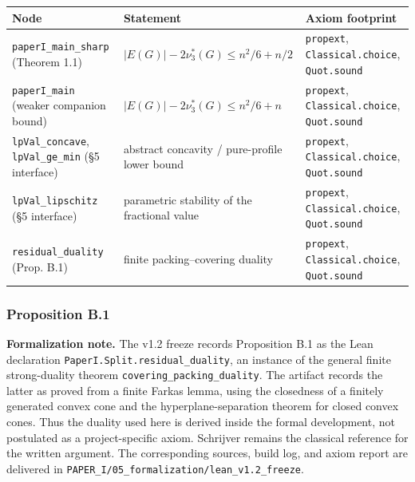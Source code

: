 \documentclass[english,11pt,a4paper]{article}
\newcounter{none}
\begin{document}
{\def\LTcaptype{none} %
\begin{longtable}[]{@{}
  >{\raggedright\arraybackslash}p{}
  >{\raggedright\arraybackslash}p{}
  >{\raggedright\arraybackslash}p{}@{}}
\toprule\noalign{}
\begin{minipage}[b]{\linewidth}\raggedright
Node
\end{minipage} & \begin{minipage}[b]{\linewidth}\raggedright
Statement
\end{minipage} & \begin{minipage}[b]{\linewidth}\raggedright
Axiom footprint
\end{minipage} \\
\midrule\noalign{}
\endhead
\bottomrule\noalign{}
\endlastfoot
\nolinkurl{paperI_main_sharp} (Theorem 1.1) &
\(\lvert E(G)\rvert-2\nu_3^*(G)\le n^2/6+n/2\) & \nolinkurl{propext},
\nolinkurl{Classical.choice}, \nolinkurl{Quot.sound} \\
\nolinkurl{paperI_main} (weaker companion bound) &
\(\lvert E(G)\rvert-2\nu_3^*(G)\le n^2/6+n\) & \nolinkurl{propext},
\nolinkurl{Classical.choice}, \nolinkurl{Quot.sound} \\
\nolinkurl{lpVal_concave}, \nolinkurl{lpVal_ge_min} (§5 interface) &
abstract concavity / pure-profile lower bound & \nolinkurl{propext},
\nolinkurl{Classical.choice}, \nolinkurl{Quot.sound} \\
\nolinkurl{lpVal_lipschitz} (§5 interface) & parametric stability of the
fractional value & \nolinkurl{propext}, \nolinkurl{Classical.choice},
\nolinkurl{Quot.sound} \\
\nolinkurl{residual_duality} (Prop. B.1) & finite packing--covering
duality & \nolinkurl{propext}, \nolinkurl{Classical.choice},
\nolinkurl{Quot.sound} \\
\end{longtable}
}

\subsubsection{Proposition B.1}\label{proposition-b.1}

\textbf{Formalization note.} The v1.2 freeze records Proposition B.1 as
the Lean declaration \nolinkurl{PaperI.Split.residual_duality}, an
instance of the general finite strong-duality theorem
\nolinkurl{covering_packing_duality}. The artifact records the latter as
proved from a finite Farkas lemma, using the closedness of a finitely
generated convex cone and the hyperplane-separation theorem for closed
convex cones. Thus the duality used here is derived inside the formal
development, not postulated as a project-specific axiom. Schrijver
remains the classical reference for the written argument. The
corresponding sources, build log, and axiom report are delivered in
\nolinkurl{PAPER_I/05_formalization/lean_v1.2_freeze}.
\end{document}
